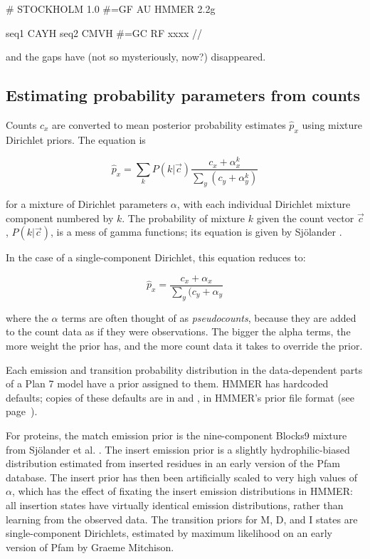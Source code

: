 \begin{sreoutput}
# STOCKHOLM 1.0
#=GF AU    HMMER 2.2g

seq1        CAYH
seq2        CMVH
#=GC RF     xxxx
//
\end{sreoutput}

and the gaps have (not so mysteriously, now?) disappeared.

\subsection{Estimating probability parameters from counts}

Counts $c_x$ are converted to mean posterior probability estimates
$\hat{p}_x$ using mixture Dirichlet priors.  The equation is

\[
  \hat{p}_x = \sum_k P(k | \vec{c})
  \frac{c_x + \alpha_x^k}{\sum_{y} (c_y + \alpha_{y}^k) }
\]

for a mixture of Dirichlet parameters $\alpha$, with each individual
Dirichlet mixture component numbered by $k$. The probability of
mixture $k$ given the count vector $\vec{c}$, $P(k | \vec{c})$, is a
mess of gamma functions; its equation is given by Sj\"{o}lander
\cite{Sjolander96,Durbin98}.

In the case of a single-component Dirichlet, this equation reduces to:

\[ 
  \hat{p}_x = \frac{c_x + \alpha_x}{\sum_{y} (c_y + \alpha_{y} }
\]

where the $\alpha$ terms are often thought of as \emph{pseudocounts},
because they are added to the count data as if they were observations.
The bigger the alpha terms, the more weight the prior has, and the
more count data it takes to override the prior.

Each emission and transition probability distribution in the
data-dependent parts of a Plan 7 model have a prior assigned to them.
HMMER has hardcoded defaults; copies of these defaults are in
 and , in HMMER's
prior file format (see page~\pageref{section:priorfiles}).

For proteins, the match emission prior is the nine-component Blocks9
mixture from Sj\"{o}lander et al. \cite{Sjolander96}. The insert
emission prior is a slightly hydrophilic-biased distribution estimated
from inserted residues in an early version of the Pfam database. The
insert prior has then been artificially scaled to very high values of
$\alpha$, which has the effect of fixating the insert emission
distributions in HMMER: all insertion states have virtually identical
emission distributions, rather than learning from the observed data.
The transition priors for M, D, and I states are single-component
Dirichlets, estimated by maximum likelihood on an early version of
Pfam by Graeme Mitchison.

